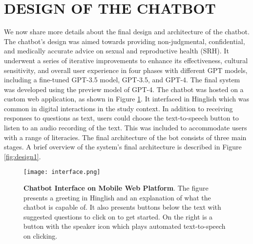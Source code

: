 \section{DESIGN OF THE CHATBOT}

We now share more details about the final design and architecture of the chatbot. The chatbot's design was aimed towards providing non-judgmental, confidential, and medically accurate advice on sexual and reproductive health (SRH). It underwent a series of iterative improvements to enhance its effectiveness, cultural sensitivity, and overall user experience in four phases with different GPT models, including a fine-tuned GPT-3.5 model, GPT-3.5, and GPT-4. The final system was developed using the preview model of GPT-4. The chatbot was hosted on a custom web application, as shown in Figure \ref{fig:interface}. It interfaced in Hinglish  which was common in digital interactions in the study context. In addition to receiving responses to questions as text, users could choose the text-to-speech button to listen to an audio recording of the text. This was included to accommodate users with a range of literacies. The final architecture of the bot consists of three main stages. A brief overview of the system's final architecture is described in Figure \ref{fig:design1}.



\begin{figure}[h]
  \centering
  \texttt{[image: interface.png]} 
  \caption{\textbf{Chatbot Interface on Mobile Web Platform}. The figure presents a greeting in Hinglish and an explanation of what the chatbot is capable of. It also presents buttons below the text with suggested questions to click on to get started. On the right is a button with the speaker icon which plays automated text-to-speech on clicking.}
  \label{fig:interface}
\end{figure}



